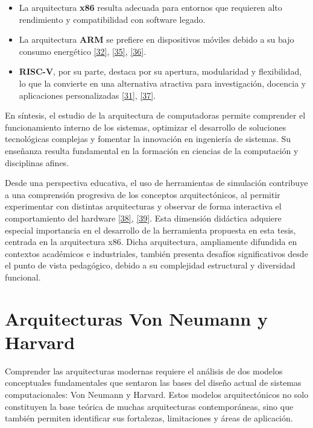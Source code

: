 \documentclass[12pt,oneside]{templates/unerthesis}
\providecommand{\tightlist}{%
  \setlength{\itemsep}{0pt}\setlength{\parskip}{0pt}}
\begin{document}
\begin{itemize}
\tightlist
\item
  La arquitectura \textbf{x86} resulta adecuada para entornos que requieren alto rendimiento y compatibilidad con software legado.
\item
  La arquitectura \textbf{ARM} se prefiere en dispositivos móviles debido a su bajo consumo energético \protect\hyperlink{ref-harris2015digital}{{[}32{]}}, \protect\hyperlink{ref-patterson_computer_2016}{{[}35{]}}, \protect\hyperlink{ref-belli2020iot}{{[}36{]}}.
\item
  \textbf{RISC-V}, por su parte, destaca por su apertura, modularidad y flexibilidad, lo que la convierte en una alternativa atractiva para investigación, docencia y aplicaciones personalizadas \protect\hyperlink{ref-waterman_risc-v_2014}{{[}31{]}}, \protect\hyperlink{ref-patterson_computer_2017}{{[}37{]}}.
\end{itemize}

En síntesis, el estudio de la arquitectura de computadoras permite comprender el funcionamiento interno de los sistemas, optimizar el desarrollo de soluciones tecnológicas complejas y fomentar la innovación en ingeniería de sistemas. Su enseñanza resulta fundamental en la formación en ciencias de la computación y disciplinas afines.

Desde una perspectiva educativa, el uso de herramientas de simulación contribuye a una comprensión progresiva de los conceptos arquitectónicos, al permitir experimentar con distintas arquitecturas y observar de forma interactiva el comportamiento del hardware \protect\hyperlink{ref-akram2019survey}{{[}38{]}}, \protect\hyperlink{ref-menchonherramientas}{{[}39{]}}. Esta dimensión didáctica adquiere especial importancia en el desarrollo de la herramienta propuesta en esta tesis, centrada en la arquitectura x86. Dicha arquitectura, ampliamente difundida en contextos académicos e industriales, también presenta desafíos significativos desde el punto de vista pedagógico, debido a su complejidad estructural y diversidad funcional.

\hypertarget{arquitecturas-von-neumann-y-harvard}{%
\section{Arquitecturas Von Neumann y Harvard}\label{arquitecturas-von-neumann-y-harvard}}

Comprender las arquitecturas modernas requiere el análisis de dos modelos conceptuales fundamentales que sentaron las bases del diseño actual de sistemas computacionales: Von Neumann y Harvard. Estos modelos arquitectónicos no solo constituyen la base teórica de muchas arquitecturas contemporáneas, sino que también permiten identificar sus fortalezas, limitaciones y áreas de aplicación.
\end{document}

